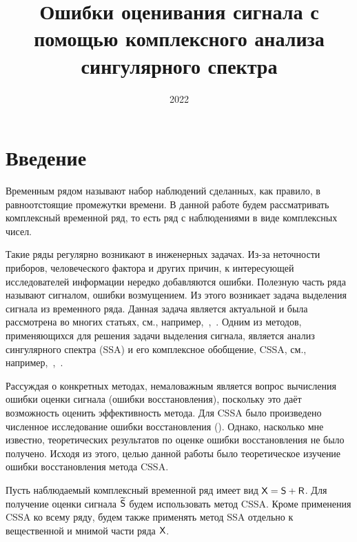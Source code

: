 \documentclass[12pt,a4paper]{article}
\title{Ошибки оценивания сигнала с помощью комплексного анализа сингулярного спектра
}
\date{2022}
\begin{document}
\maketitle

\section{Введение}


Временным рядом называют набор наблюдений сделанных, как правило, в равноотстоящие промежутки времени. В данной работе будем рассматривать комплексный временной ряд, то есть ряд с наблюдениями в виде комплексных чисел.

Такие ряды регулярно возникают в инженерных задачах. Из-за неточности приборов, человеческого фактора и других причин, к интересующей исследователей информации нередко добавляются ошибки. Полезную часть ряда называют сигналом, ошибки возмущением. Из этого возникает задача выделения сигнала из временного ряда. Данная задача является актуальной и была рассмотрена во многих статьях, см., например,~\cite{8683056},~\cite{MOOERS19731129}. Одним из методов, применяющихся для решения задачи выделения сигнала, является анализ сингулярного спектра (SSA) и его комплексное обобщение, CSSA, см., например,~\cite{7337988},~\cite{Chen}.

Рассуждая о конкретных методах, немаловажным является вопрос вычисления ошибки оценки сигнала (ошибки восстановления), поскольку это даёт возможность оценить эффективность метода. Для CSSA было произведено численное исследование ошибки восстановления (\cite{Golyandina.etal2013}). Однако, насколько мне известно, теоретических результатов по оценке ошибки восстановления не было получено. Исходя из этого, целью данной работы было теоретическое изучение ошибки восстановления метода CSSA.

Пусть наблюдаемый комплексный временной ряд имеет вид $\textsf{X} =\textsf{S} + \textsf{R}$. Для получение оценки сигнала $\widetilde{\textsf{S}}$ будем использовать метод CSSA. Кроме применения CSSA ко всему ряду, будем также применять метод SSA отдельно к вещественной и мнимой части ряда $\textsf{X}$.
\end{document}
